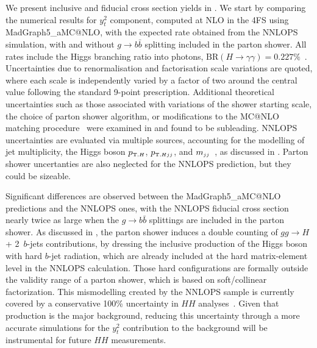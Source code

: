 \documentclass[11pt,a4paper]{article}
\begin{document}
We present inclusive and fiducial cross section yields in .
We start by comparing the numerical results for \bbH{} $y_t^2$ component, computed at NLO in the 4FS using {\sc MadGraph5\_aMC@NLO}, with the 
expected rate obtained from the {\sc NNLOPS} simulation, with and without $g\rightarrow b\bar{b}$ splitting included in the parton shower. 
All rates include the Higgs branching ratio into photons, $\textrm{BR}(H \to \gamma\gamma) = 0.227\%$~\cite{LHCHiggsCrossSectionWorkingGroup:2016ypw}. 
Uncertainties due to renormalisation and factorisation scale variations are quoted, where each scale is independently varied by a factor of two around the 
central value following the standard 9-point prescription. Additional theoretical uncertainties such as those associated with variations of the shower starting scale, 
the choice of parton shower algorithm, or modifications to the MC@NLO matching procedure~\cite{frixione:2002ik,frederix:2020trv} were examined 
in  and found to be subleading. 
{\sc NNLOPS} uncertainties are evaluated via multiple sources, accounting for the modelling of jet multiplicity, the Higgs boson $\ptH$, $\ptHjj$, and $\mjj$~\cite{deFlorian:2016spz,Liu:2013hba,stewart:2013faa,Boughezal:2013oha,Stewart:2011cf,Gangal:2013nxa}, as discussed in . Parton shower uncertanties are also neglected for the {\sc NNLOPS} prediction, but they could be sizeable. 


Significant differences are observed between the {\sc MadGraph5\_aMC@NLO} predictions and 
the {\sc NNLOPS} ones, with the {\sc NNLOPS} fiducial cross section nearly twice as large when 
the  $g\rightarrow b\bar{b}$ splittings are included in the parton shower. 
As discussed in , the parton shower induces a double counting of 
$gg\to H$ + 2~$b$-jets contributions, by dressing the inclusive production of the Higgs boson with hard $b$-jet
radiation, which are already included at the hard matrix-element level in the {\sc NNLOPS} calculation. 
Those hard configurations are formally outside the validity range of a parton shower, which is based on soft/collinear
factorization. This mismodelling created by the {\sc NNLOPS} sample is currently covered by a 
conservative 100\% uncertainty in $HH$ analyses~\cite{HDBS-2021-10,ATLAS:2025hhd}. Given
that \bbH{} production is the major background, reducing this uncertainty through a more
accurate simulations for the $y_t^2$ contribution to the \bbH{} background will be 
instrumental for future $HH$ measurements.
\end{document}

